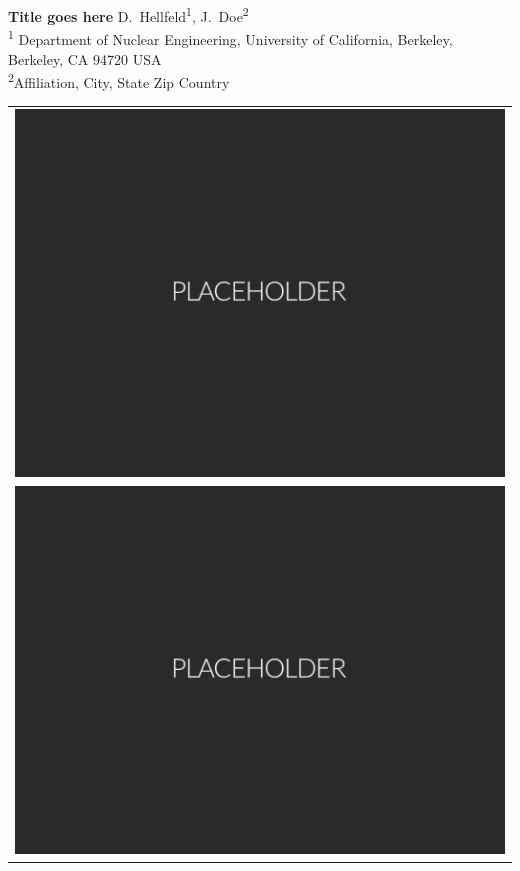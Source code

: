 \documentclass[a0paper,portrait]{baposter}
\newcommand{\me}{D.~Hellfeld}
\newcommand{\affiliation}{University of California, Berkeley}
\newcommand{\department}{Nuclear Engineering}
\newcommand{\affiliationlocation}{Berkeley, CA 94720 USA}
\newcommand{\postertitle}{Title goes here}
\begin{document}
\begin{poster}
{\begin{tabular}{c}
  \end{tabular}
}
{
\bf\LARGE{\postertitle}
}
%
{\vspace{0.6em}
  \large{\me\textsuperscript{1}, J.~Doe\textsuperscript{2}} \\[0.4em]

  \small{\textsuperscript{1} Department of \department, \affiliation, \affiliationlocation \\[-0.2em]
             \textsuperscript{2}Affiliation, City, State Zip Country \\[-0.2em]}
}
{
  \begin{tabular}{c}
  \includegraphics[height=0.4\headerheight]{Figures/Placeholder.png} \\
  \includegraphics[height=0.4\headerheight]{Figures/Placeholder.png}
  \end{tabular}
}



\end{poster}
\end{document}
